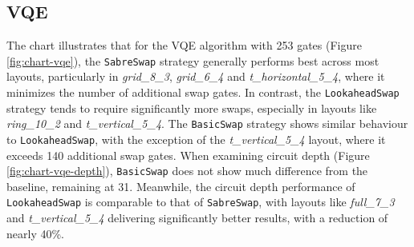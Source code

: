 \subsection{VQE}
The chart illustrates that for the VQE algorithm with 253 gates (Figure \ref{fig:chart-vqe}), the \lstinline{SabreSwap} strategy generally performs best across most layouts, particularly in \textit{grid\_8\_3}, \textit{grid\_6\_4} and \textit{t\_horizontal\_5\_4}, where it minimizes the number of additional swap gates. In contrast, the \lstinline{LookaheadSwap} strategy tends to require significantly more swaps, especially in layouts like \textit{ring\_10\_2} and \textit{t\_vertical\_5\_4}. The \lstinline{BasicSwap} strategy shows similar behaviour to \lstinline{LookaheadSwap}, with the exception of the \textit{t\_vertical\_5\_4} layout, where it exceeds 140 additional swap gates. When examining circuit depth (Figure \ref{fig:chart-vqe-depth}), \lstinline{BasicSwap} does not show much difference from the baseline, remaining at 31. Meanwhile, the circuit depth performance of \lstinline{LookaheadSwap} is comparable to that of \lstinline{SabreSwap}, with layouts like \textit{full\_7\_3} and \textit{t\_vertical\_5\_4} delivering significantly better results, with a reduction of nearly 40\%.
